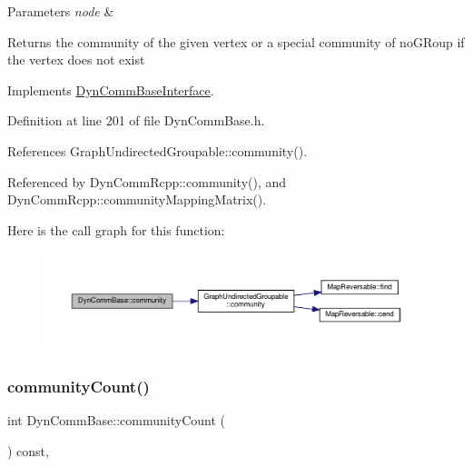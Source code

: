 \begin{DoxyParams}{Parameters}
{\em node} & \\
\hline
\end{DoxyParams}
\begin{DoxyReturn}{Returns}
the community of the given vertex or a special community of no\+G\+Roup if the vertex does not exist 
\end{DoxyReturn}


Implements \hyperlink{classDynCommBaseInterface_a9453a177580033aa1d4d9f165350ceba}{Dyn\+Comm\+Base\+Interface}.



Definition at line 201 of file Dyn\+Comm\+Base.\+h.



References Graph\+Undirected\+Groupable\+::community().



Referenced by Dyn\+Comm\+Rcpp\+::community(), and Dyn\+Comm\+Rcpp\+::community\+Mapping\+Matrix().

Here is the call graph for this function\+:
\nopagebreak
\begin{figure}[H]
\begin{center}
\leavevmode
\includegraphics[width=350pt]{classDynCommBase_a651753518a2de4ea52caea518e74d878_cgraph}
\end{center}
\end{figure}
\mbox{\label{classDynCommBase_add5d1d59a3f20b4ba039342b31551fb3}} 
\subsubsection{\texorpdfstring{community\+Count()}{communityCount()}}
{\footnotesize\ttfamily int Dyn\+Comm\+Base\+::community\+Count (\begin{DoxyParamCaption}{ }\end{DoxyParamCaption}) const\hspace{0.3cm}{\ttfamily [inline]}, {\ttfamily [virtual]}}


